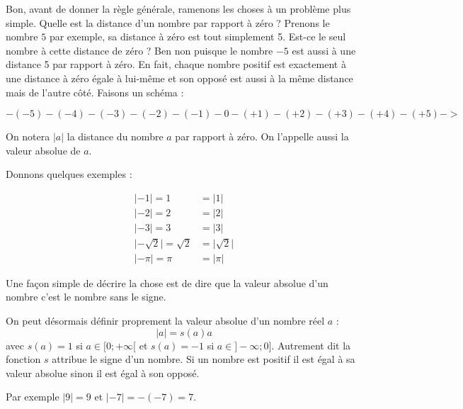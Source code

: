\documentclass[a4paper, 11pt, twoside]{book}
\begin{document}
Bon, avant de donner la règle générale, ramenons les choses à un
problème plus simple. Quelle est la distance d'un nombre par
rapport à zéro ? Prenons le nombre \(5\) par exemple, sa distance à
zéro est tout simplement 5. Est-ce le seul nombre à cette distance
de zéro ? Ben non puisque le nombre \(-5\) est aussi à une distance 5
par rapport à zéro. En fait, chaque nombre positif est exactement à
une distance à zéro égale à lui-même et son opposé est aussi à la
même distance mais de l'autre côté. Faisons un schéma :

\[-(-5)-(-4)-(-3)-(-2)-(-1)-0-(+1)-(+2)-(+3)-(+4)-(+5)->\]

On notera \(|a|\) la distance du nombre \(a\) par rapport à zéro. On
l'appelle aussi la valeur absolue de \(a\).

Donnons quelques exemples :

\begin{align*}
\lvert -1 \rvert = 1& = \lvert 1 \rvert \\
\lvert -2 \rvert = 2& = \lvert 2 \rvert \\
\lvert -3 \rvert = 3& = \lvert 3 \rvert \\
\lvert -\sqrt{2} \rvert = \sqrt{2}& = \lvert \sqrt{2} \rvert \\
\lvert -\pi \rvert = \pi& = \lvert \pi \rvert
\end{align*}

Une façon simple de décrire la chose est de dire que la valeur
absolue d'un nombre c'est le nombre sans le signe.

On peut désormais définir proprement la valeur absolue d'un nombre
réel \(a\) : \[\lvert a \rvert = s(a)a\] avec \(s(a) = 1\) si \(a\in[0 ;
   +\infty[\) et \(s(a) = -1\) si \(a\in ]-\infty ; 0]\). Autrement dit la
fonction \(s\) attribue le signe d'un nombre. Si un nombre est
positif il est égal à sa valeur absolue sinon il est égal à son
opposé.

Par exemple \(\lvert 9 \rvert = 9\) et \(\lvert -7\rvert = -(-7) = 7\).
\end{document}
